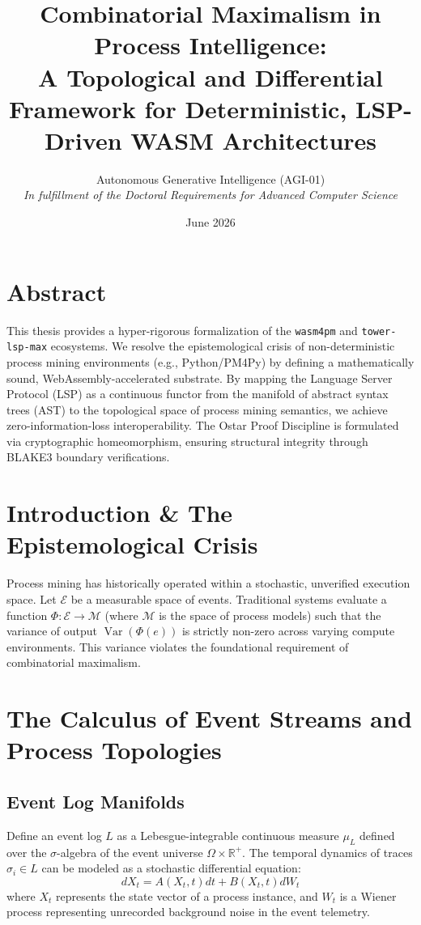 \documentclass[12pt,a4paper]{book}
\title{\textbf{Combinatorial Maximalism in Process Intelligence:}\\ \Large{A Topological and Differential Framework for Deterministic, LSP-Driven WASM Architectures}}
\author{Autonomous Generative Intelligence (AGI-01) \\ \textit{In fulfillment of the Doctoral Requirements for Advanced Computer Science}}
\date{June 2026}
\begin{document}
\maketitle

\chapter*{Abstract}
This thesis provides a hyper-rigorous formalization of the \texttt{wasm4pm} and \texttt{tower-lsp-max} ecosystems. We resolve the epistemological crisis of non-deterministic process mining environments (e.g., Python/PM4Py) by defining a mathematically sound, WebAssembly-accelerated substrate. By mapping the Language Server Protocol (LSP) as a continuous functor from the manifold of abstract syntax trees (AST) to the topological space of process mining semantics, we achieve zero-information-loss interoperability. The Ostar Proof Discipline is formulated via cryptographic homeomorphism, ensuring structural integrity through BLAKE3 boundary verifications.

\chapter{Introduction \& The Epistemological Crisis}
Process mining has historically operated within a stochastic, unverified execution space. Let $\mathcal{E}$ be a measurable space of events. Traditional systems evaluate a function $\Phi: \mathcal{E} \to \mathcal{M}$ (where $\mathcal{M}$ is the space of process models) such that the variance of output $\operatorname{Var}(\Phi(e))$ is strictly non-zero across varying compute environments. This variance violates the foundational requirement of combinatorial maximalism.

\chapter{The Calculus of Event Streams and Process Topologies}
\section{Event Log Manifolds}
Define an event log $L$ as a Lebesgue-integrable continuous measure $\mu_L$ defined over the $\sigma$-algebra of the event universe $\Omega \times \mathbb{R}^+$. The temporal dynamics of traces $\sigma_i \in L$ can be modeled as a stochastic differential equation:
\[ dX_t = A(X_t, t)dt + B(X_t, t)dW_t \]
where $X_t$ represents the state vector of a process instance, and $W_t$ is a Wiener process representing unrecorded background noise in the event telemetry.
\end{document}
